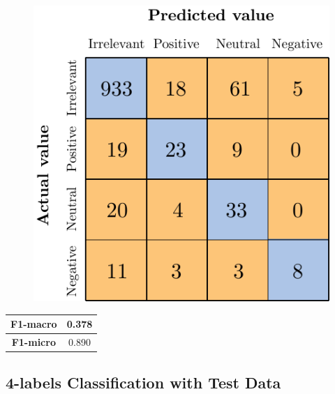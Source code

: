 \begin{figure}[H]
	\centering
	\includegraphics[scale=1]{figures/conf_matrices/ita_cascade_bpef/ita_cascade_bpef_val.pdf}
	\label{fig:ita_cascade_bpef_val}
\end{figure}

\begin{center}
	\begin{tabular}{ | c | c | } 
		\hline
		\textbf{F1-macro} & 0.378 \\
		\hline
		\textbf{F1-micro} & 0.890 \\ 
		\hline
	\end{tabular}
\end{center}




\subsection{4-labels Classification with Test Data}

